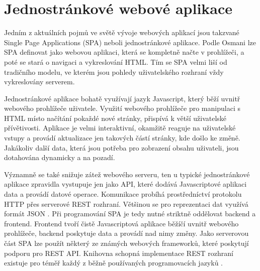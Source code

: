 \chapter{Jednostránkové webové aplikace}
Jedním z aktuálních pojmů ve světě vývoje webových aplikací jsou takzvané Single Page Applications (SPA) neboli jednostránkové aplikace. Podle Osmani \cite{osmani_spa} lze SPA definovat jako webovou aplikaci, která se kompletně načte v prohlížeči, a poté se stará o navigaci a vykreslování HTML. Tím se SPA velmi liší od tradičního modelu, ve kterém jsou pohledy uživatelského rozhraní vždy vykreslovány serverem.

Jednostránkové aplikace bohatě využívají jazyk Javascript, který běží uvnitř webového prohlížeče uživatele. Využití webového prohlížeče pro manipulaci s HTML místo načítání pokaždé nové stránky, přispívá k větší uživatelské přívětivosti. Aplikace je velmi interaktivní, okamžitě reaguje na uživatelské vstupy a provádí aktualizace jen takových částí stránky, kde došlo ke změně. Jakákoliv další data, která jsou potřeba pro zobrazení obsahu uživateli, jsou dotahována dynamicky a na pozadí. 

Významně se také snižuje zátež webového serveru, ten u typické jednostránkové aplikace zpravidla vystupuje jen jako API, které dodává Javascriptové aplikaci data a provádí datové operace. Komunikace probíhá prostředníctví protokolu HTTP přes serverové REST rozhraní. Většinou se pro reprezentaci dat využívá formát JSON \cite{json}. Při programování SPA je tedy nutné striktně oddělovat backend a frontend. Frontend tvoří čistě Javascriptová aplikace běžíčí uvnitř webového prohlížeče, backend poskytuje data a provádí nad nimy změny. Jako serverovou část SPA lze použít některý ze známých webových frameworků, které poskytují podporu pro REST API. Knihovna schopná implementace REST rozhraní existuje pro téměř každý z běžně používaných programovacích jazyků \cite{spa_book} \cite{spa_web}. 

